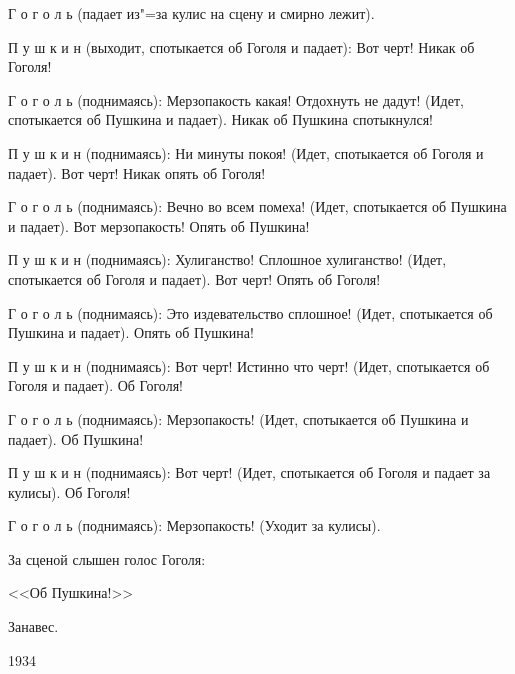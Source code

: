 Г о г о л ь (падает из"=за кулис на сцену 
и смирно лежит).
    
П у ш к и н (выходит, спотыкается об 
Гоголя и падает): Вот черт! Никак об Гоголя!
    
Г о г о л ь (поднимаясь): Мерзопакость
какая! Отдохнуть не дадут! (Идет, спотыкается 
об Пушкина и падает). Никак об Пушкина
спотыкнулся!
    
П у ш к и н (поднимаясь): Ни минуты покоя! 
(Идет, спотыкается об Гоголя и падает).
Вот черт! Никак опять об Гоголя!
    
Г о г о л ь (поднимаясь): Вечно во всем
помеха! (Идет, спотыкается об Пушкина и 
падает). Вот мерзопакость! Опять об Пушкина!
    
П у ш к и н (поднимаясь): Хулиганство!
Сплошное хулиганство! (Идет, спотыкается об
Гоголя и падает). Вот черт! Опять об Гоголя!
    
Г о г о л ь (поднимаясь): Это издевательство 
сплошное! (Идет, спотыкается об 
Пушкина и падает). Опять об Пушкина!
    
П у ш к и н (поднимаясь): Вот черт! 
Истинно что черт! (Идет, спотыкается об Гоголя
и падает). Об Гоголя!
    
Г о г о л ь (поднимаясь): Мерзопакость!
(Идет, спотыкается об Пушкина и падает). Об
Пушкина!
    
П у ш к и н (поднимаясь): Вот черт!
(Идет, спотыкается об Гоголя и падает за 
кулисы). Об Гоголя!
    
Г о г о л ь (поднимаясь): Мерзопакость!
(Уходит за кулисы).
\begin{center}
За сценой слышен голос Гоголя:
               
<<Об Пушкина!>>
                 
Занавес.
\end{center}

\begin{flushright}
    1934
\end{flushright}